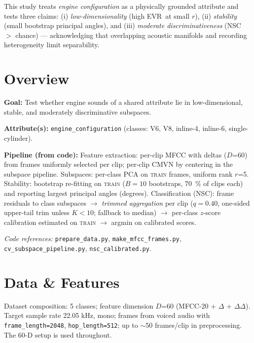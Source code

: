 \documentclass[11pt]{article}
\newcommand{\D}{\ensuremath{D}\xspace}
\newcommand{\rankr}{\ensuremath{r}\xspace}
\newcommand{\EVR}{EVR\xspace}
\newcommand{\NSC}{NSC\xspace}
\begin{document}
This study treats \emph{engine configuration} as a physically grounded attribute and tests three claims: (i) \emph{low-dimensionality} (high \EVR\ at small \rankr), (ii) \emph{stability} (small bootstrap principal angles), and (iii) \emph{moderate discriminativeness} (\NSC\ $>$ chance) --- acknowledging that overlapping acoustic manifolds and recording heterogeneity limit separability.

\section{Overview}

\textbf{Goal:} Test whether engine sounds of a shared attribute lie in low-dimensional, stable, and moderately discriminative subspaces.

\textbf{Attribute(s):} \texttt{engine\_configuration} (classes: V6, V8, inline-4, inline-6, single-cylinder).

\textbf{Pipeline (from code):} Feature extraction: per-clip MFCC with deltas (\D=60) from frames uniformly selected per clip; per-clip CMVN by centering in the subspace pipeline. Subspaces: per-class PCA on \textsc{train} frames, uniform rank \rankr=5. Stability: bootstrap re-fitting on \textsc{train} ($B=10$ bootstraps, \SI{70}{\percent} of clips each) and reporting largest principal angles (degrees). Classification (\NSC): frame residuals to class subspaces $\rightarrow$ \emph{trimmed aggregation} per clip ($q=0.40$, one-sided upper-tail trim unless $K<10$; fallback to median) $\rightarrow$ per-class $z$-score calibration estimated on \textsc{train} $\rightarrow$ argmin on calibrated scores.

\noindent\textit{Code references:} \texttt{prepare\_data.py}, \texttt{make\_mfcc\_frames.py}, \texttt{cv\_subspace\_pipeline.py}, \texttt{nsc\_calibrated.py}.

\section{Data \& Features}

Dataset composition: 5 classes; feature dimension \D=\num{60} (MFCC-20 + $\Delta$ + $\Delta\Delta$). Target sample rate 22.05 kHz, mono; frames from voiced audio with \texttt{frame\_length=2048}, \texttt{hop\_length=512}; up to $\sim$50 frames/clip in preprocessing. The 60-D setup is used throughout.
\end{document}
